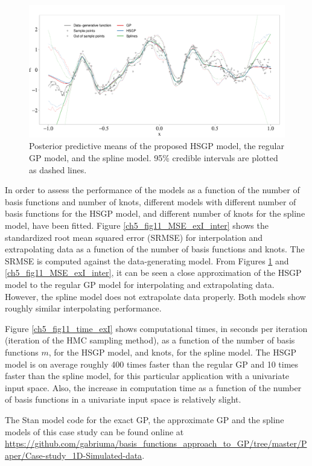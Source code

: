 \documentclass[onecolumn,a4paper,11pt]{article}
\begin{document}
\begin{figure}
\centering
\includegraphics[width=\textwidth]{ch5_fig10_Posteriors_exI.pdf}
\caption{Posterior predictive means of the proposed HSGP model, the regular GP model, and the spline model. 95\% credible intervals are plotted as dashed lines.}
  \label{ch5_fig10_Posteriors_exI}
\end{figure}

In order to assess the performance of the models as a function of the number of basis functions and number of knots, different models with different number of basis functions for the HSGP model, and different number of knots for the spline model, have been fitted. Figure \ref{ch5_fig11_MSE_exI_inter} shows the standardized root mean squared error (SRMSE) for interpolation and extrapolating data as a function of the number of basis functions and knots. The SRMSE is computed against the data-generating model. From Figures \ref{ch5_fig10_Posteriors_exI} and \ref{ch5_fig11_MSE_exI_inter}, it can be seen a close approximation of the HSGP model to the regular GP model for interpolating and extrapolating data. However, the spline model does not extrapolate data properly. Both models show roughly similar interpolating performance. 

Figure \ref{ch5_fig11_time_exI} shows computational times, in seconds per iteration (iteration of the HMC sampling method), as a function of the number of basis functions $m$, for the HSGP model, and knots, for the spline model. The HSGP model is on average roughly 400 times faster than the regular GP and 10 times faster than the spline model, for this particular application with a univariate input space. Also, the increase in computation time as a function of the number of basis functions in a univariate input space is relatively slight.

The Stan model code for the exact GP, the approximate GP and the spline models of this case study can be found online at {\small \url{ https://github.com/gabriuma/basis_functions_approach_to_GP/tree/master/Paper/Case-study_1D-Simulated-data}}.
%
\end{document}
